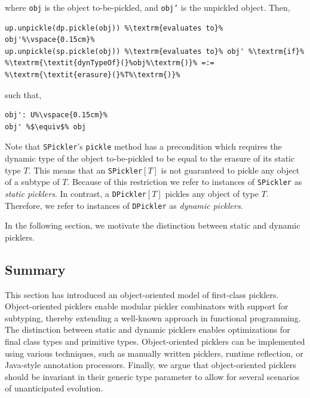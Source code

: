 \documentclass[preprint,10pt]{sigplanconf}
\theoremstyle{definition}
\theoremstyle{definition}
\newcommand{\term}[1]{\mbox{\texttt{#1}}}
\begin{document}
{\begin{defn}
\noindent where \term{obj} is the object to-be-pickled, and \term{obj'} is the unpickled
object. Then,

\begin{lstlisting}[escapechar=\%]
up.unpickle(dp.pickle(obj)) %\textrm{evaluates to}% obj'%\vspace{0.15cm}%
up.unpickle(sp.pickle(obj)) %\textrm{evaluates to}% obj' %\textrm{if}% %\textrm{\textit{dynTypeOf}(}%obj%\textrm{)}% =:= %\textrm{\textit{erasure}(}%T%\textrm{)}%
\end{lstlisting}

\noindent such that,

\begin{lstlisting}[escapechar=\%]
obj': U%\vspace{0.15cm}%
obj' %$\equiv$% obj
\end{lstlisting}
\end{defn}

Note that \term{SPickler}'s \term{pickle} method has a precondition which
requires the dynamic type of the object to-be-pickled to be equal to the
erasure of its static type $T$. This means that an \term{SPickler}$[T]$ is not
guaranteed to pickle any object of a subtype of $T$. Because of this
restriction we refer to instances of \term{SPickler} as {\em static picklers}.
In contrast, a \term{DPickler}$[T]$ pickles any object of type $T$. Therefore,
we refer to instances of \term{DPickler} as {\em dynamic picklers}.

In the following section, we motivate the distinction between static and
dynamic picklers.

}

\subsection{Summary}

This section has introduced an object-oriented model of first-class picklers.
Object-oriented picklers enable modular pickler combinators with support for
subtyping, thereby extending a well-known approach in functional programming.
The distinction between static and dynamic picklers enables optimizations for
final class types and primitive types. Object-oriented picklers can be
implemented using various techniques, such as manually written picklers,
runtime reflection, or Java-style annotation processors. Finally, we argue
that object-oriented picklers should be invariant in their generic type
parameter to allow for several scenarios of unanticipated evolution.
\end{document}
